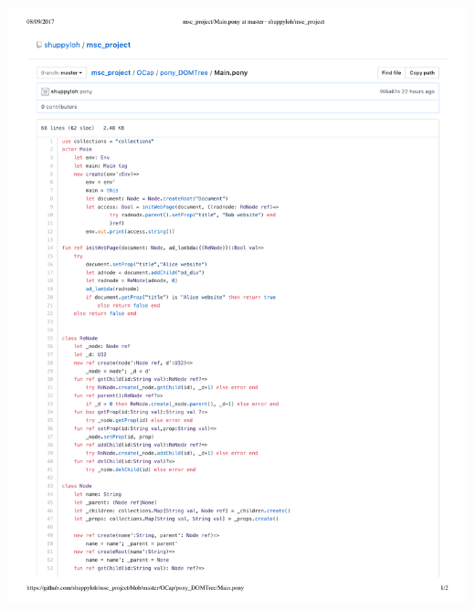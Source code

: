 \documentclass[a4paper,11pt,twoside]{article}
\begin{document}
{\begin{minipage}{\textwidth}
\includegraphics[width=\textwidth,valign=t,page=2]{figures/code_DOM.pdf}
\end{minipage}\clearpage
}
\end{document}
